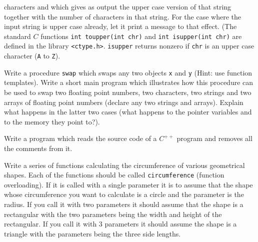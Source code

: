 \begin{exercises}
         characters and which gives as output the upper case version of that
         string together with the number of characters in that string. For the
         case where the input string is upper case already, let it print
         a message to that effect.
         (The standard $C$ functions \verb+int toupper(int chr)+ and
         \verb+int isupper(int chr)+  are defined
         in the library \verb+<ctype.h>+. 
         \verb+isupper+ returns nonzero if \verb+chr+ is an upper case
         character (\verb+A+ to \verb+Z+).
  \item Write a procedure \verb+swap+ which swaps any two objects \verb+x+ and
         \verb+y+ (Hint: use function templates).
          
         Write a short main program which illustrates how this procedure can be
         used to swap two floating point numbers, two characters, two strings
         and two arrays of floating point numbers (declare any two strings
         and arrays). Explain what happens in the latter two cases (what
         happens to the pointer variables and to the memory they point to?).
  \item Write a program which reads the source code of a $C^{++}$
          program and removes all the comments from it.
  \item Write a series of functions calculating the circumference of various
           geometrical shapes. Each of the functions should be called
           \verb+circumference+ (function overloading).
          If it is called with a single parameter it is to assume
          that the shape whose circumference you want to calculate
          is a circle and the parameter is the radius. If you call it with
          two parameters it should assume that the shape is a rectangular
          with the two parameters being the width and height of the
          rectangular. If you call it with 3 parameters it should assume
          the shape is a triangle with the parameters being the three
          side lengths.
\end{exercises}
